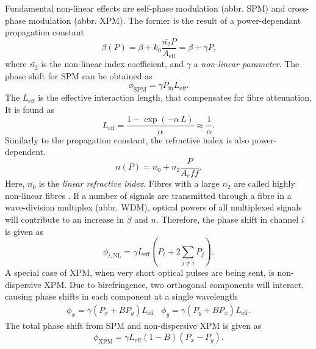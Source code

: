 \documentclass{standalone}
\begin{document}
Fundamental non-linear effects are self-phase modulation (abbr. SPM) and cross-phase modulation (abbr. XPM). The former is the result of a power-dependant propagation constant
\begin{equation}
\beta(P) = \beta + k_0 \frac{\bar{n_2} P}{A_\textrm{eff}} = \beta + \gamma P \textrm{,}
\end{equation}
where $\bar{n_2}$ is the non-linear index coefficient, and $\gamma$ a \textit{non-linear parameter}. The phase shift for SPM can be obtained as
\begin{equation}
\phi_\textrm{SPM} = \gamma P_\textrm{in} L_\textrm{eff} \textrm{.}
\end{equation}
The $L_\textrm{eff}$ is the effective interaction length, that compensates for fibre attenuation. It is found as
\begin{equation} \label{eq:leff}
L_\textrm{eff} = \frac{1 - \exp\left(-\alpha \, L\right)}{\alpha} \approx \frac{1}{\alpha} \textrm{.}
\end{equation}
Similarly to the propagation constant, the refractive index is also power-dependent.
\begin{equation}
n(P) = \bar{n_0} + \bar{n_2} \frac{P}{A_eff} \textrm{.}
\end{equation}
Here, $\bar{n_0}$ is the \textit{linear refractive index}. Fibres with a large $\bar{n_2}$ are called highly non-linear fibres \cite{Hiroishi2003}. If a number of signals are transmitted through a fibre in a wave-division multiplex (abbr. WDM), optical powers of all multiplexed signals will contribute to an increase in $\beta$ and $n$. Therefore, the phase shift in channel $i$ is given as
\begin{equation}
\phi_{i,\textrm{NL}} = \gamma L_\textrm{eff} \left( P_i + 2 \sum_{j\ne i} P_j \right) \textrm{.}
\end{equation}
A special case of XPM, when very short optical pulses are being sent, is non-dispersive XPM. Due to birefringence, two orthogonal components will interact, causing phase shifts in each component at a single wavelength
\begin{eqnarray}
\phi_x = \gamma \left(P_x + B P_y\right) L_\textrm{eff} & \phi_y = \gamma \left( P_y + B P_x \right) L_\textrm{eff} \textrm{.}
\end{eqnarray}
The total phase shift from SPM and non-dispersive XPM is given as
\begin{equation}
\phi_\textrm{XPM} = \gamma L_\textrm{eff} \left(1 - B\right) \left(P_x - P_y\right) \textrm{.}
\end{equation}
\end{document}

